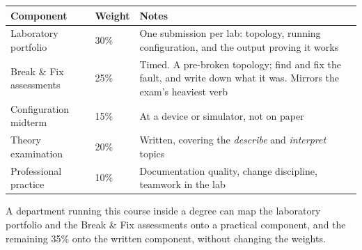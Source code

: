 \begin{longtable}{@{}L{5.6cm}C{2.2cm}L{7.4cm}@{}}
\toprule
{}
\textbf{Component} & \textbf{Weight} & \textbf{Notes} \\
\midrule
\endhead
Laboratory portfolio & 30\% &
One submission per lab: topology, running configuration, and the 
output proving it works \\
Break \& Fix assessments & 25\% &
Timed. A pre-broken topology; find and fix the fault, and write down what it was.
Mirrors the exam's heaviest verb \\
Configuration midterm & 15\% &
At a device or simulator, not on paper \\
Theory examination & 20\% &
Written, covering the \emph{describe} and \emph{interpret} topics \\
Professional practice & 10\% &
Documentation quality, change discipline, teamwork in the lab \\
\bottomrule
\end{longtable}

A department running this course inside a degree can map the laboratory
portfolio and the Break \& Fix assessments onto a practical component, and the
remaining 35\% onto the written component, without changing the weights.

\newpage
\tableofcontents
\newpage
\listoffigures
{}
\newpage

\setcounter{page}{1}
